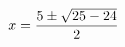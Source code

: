 \documentclass[preview]{standalone}
\begin{document}
\begin{align*}
\special{dvisvgm:raw <g id='unique000'>}x=\frac{5\pm\sqrt{25-24}}{2}\special{dvisvgm:raw </g>}
\end{align*}
\end{document}
